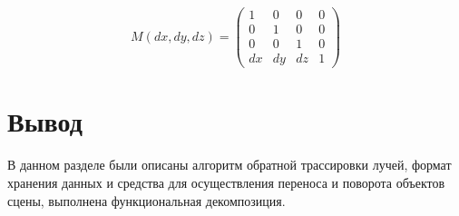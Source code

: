 
\begin{equation}\label{eq:matrix_move}
	M(dx, dy, dz) = \begin{pmatrix}
		1 & 0 & 0 & 0 \\
		0 & 1 & 0 & 0 \\
		0 & 0 & 1 & 0 \\
		dx & dy & dz & 1
	\end{pmatrix}
\end{equation}

\iffalse
\begin{equation}\label{eq:matrix_rotate_x}
	R_x(\alpha) = \begin{pmatrix}
		1 & 0 & 0 \\
		0 & cos(\alpha) & -sin(\alpha) \\
		0 & sin(\alpha) & cos(\alpha)
	\end{pmatrix}
\end{equation}

\begin{equation}\label{eq:matrix_rotate_y}
	R_y(\alpha) = \begin{pmatrix}
		cos(\alpha) & 0 & sin(\alpha) \\
		0 & 1 & 0 \\
		-sin(\alpha) & 0 & cos(\alpha)
	\end{pmatrix}
\end{equation}

\begin{equation}\label{eq:matrix_rotate_z}
	R_z(\alpha) = \begin{pmatrix}
		cos(\alpha) & -sin(\alpha) & 0 \\
		sin(\alpha) & cos(\alpha) & 0 \\
		0 & 0 & 1
	\end{pmatrix}
\end{equation}
\fi

\section*{Вывод}

В данном разделе были описаны алгоритм обратной трассировки лучей, формат хранения данных и средства для осуществления переноса и поворота объектов сцены, выполнена функциональная декомпозиция.